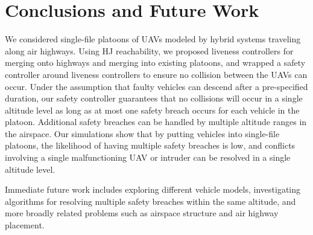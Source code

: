 \section{Conclusions and Future Work}
We considered single-file platoons of UAVs modeled by hybrid systems traveling along air highways. Using HJ reachability, we proposed liveness controllers for merging onto highways and merging into existing platoons, and wrapped a safety controller around liveness controllers to ensure no collision between the UAVs can occur. Under the assumption that faulty vehicles can descend after a pre-specified duration, our safety controller guarantees that no collisions will occur in a single altitude level as long as at most one safety breach occurs for each vehicle in the platoon. Additional safety breaches can be handled by multiple altitude ranges in the airspace. Our simulations show that by putting vehicles into single-file platoons, the likelihood of having multiple safety breaches is low, and conflicts involving a single malfunctioning UAV or intruder can be resolved in a single altitude level.

Immediate future work includes exploring different vehicle models, investigating algorithms for resolving multiple safety breaches within the same altitude, and more broadly related problems such as airspace structure and air highway placement.
